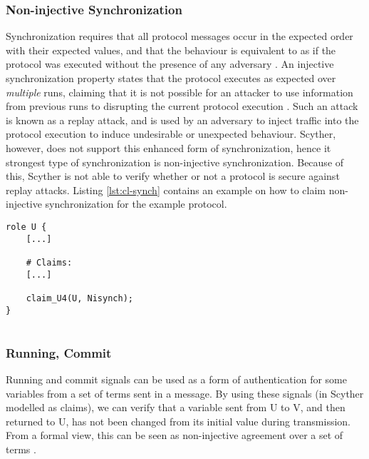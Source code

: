 \subsubsection{Non-injective Synchronization}

Synchronization requires that all protocol messages occur in the expected order with their expected values, and that the behaviour is equivalent to as if the protocol was executed without the presence of any adversary \cite{cremers2006injective}. An injective synchronization property states that the protocol executes as expected over \emph{multiple} runs, claiming that it is not possible for an attacker to use information from previous runs to disrupting the current protocol execution \cite{cremers2005operational}. Such an attack is known as a replay attack, and is used by an adversary to inject traffic into the protocol execution to induce undesirable or unexpected behaviour. Scyther, however, does not support this enhanced form of synchronization, hence it strongest type of synchronization is non-injective synchronization. Because of this, Scyther is not able to verify whether or not a protocol is secure against replay attacks. Listing \ref{lst:cl-synch} contains an example on how to claim non-injective synchronization for the example protocol.\newline

\begin{lstlisting}[caption={Claim for declaring non-injective synchronization in Scyther.}, label={lst:cl-synch}]
role U {
	[...]

	# Claims:	
	[...]
	
	claim_U4(U, Nisynch);
}


\end{lstlisting}



\subsubsection{Running, Commit}

Running and commit signals can be used as a form of authentication for some variables from a set of terms sent in a message. By using these signals (in Scyther modelled as claims), we can verify that a variable sent from U to V, and then returned to U, has not been changed from its initial value during transmission. From a formal view, this can be seen as non-injective agreement over a set of terms \cite{scyther-manual}.

